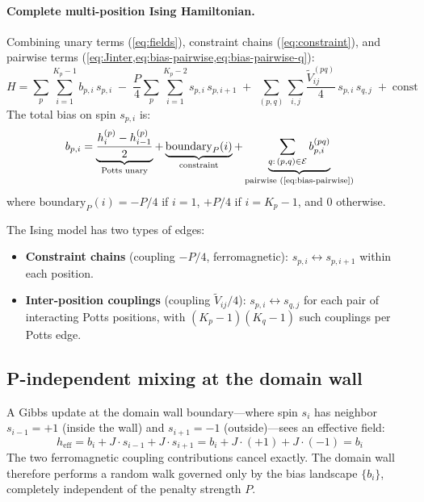 \documentclass[11pt]{article}
\begin{document}
\paragraph{Complete multi-position Ising Hamiltonian.}
Combining unary terms (\cref{eq:fields}), constraint chains (\cref{eq:constraint}), and pairwise terms (\cref{eq:Jinter,eq:bias-pairwise,eq:bias-pairwise-q}):
\begin{equation}\label{eq:full-multi}
\boxed{
  H = \sum_p \sum_{i=1}^{K_p-1} b_{p,i}\, s_{p,i}
    \;-\; \frac{P}{4}\sum_p \sum_{i=1}^{K_p-2} s_{p,i}\, s_{p,i+1}
    \;+\; \sum_{(p,q)} \sum_{i,j} \frac{\widetilde{V}^{(pq)}_{ij}}{4}\, s_{p,i}\, s_{q,j}
    \;+\; \mathrm{const}
}
\end{equation}
The total bias on spin $s_{p,i}$ is:
\begin{equation}\label{eq:total-bias}
  b_{p,i} = \underbrace{\frac{h^{(p)}_i - h^{(p)}_{i-1}}{2}}_{\text{Potts unary}}
  + \underbrace{\text{boundary}_{P}(i)}_{\text{constraint}}
  + \underbrace{\sum_{q:\,(p,q)\in\mathcal{E}} b_{p,i}^{(pq)}}_{\text{pairwise (\cref{eq:bias-pairwise})}}
\end{equation}
where $\text{boundary}_P(i) = -P/4$ if $i=1$, $+P/4$ if $i=K_p{-}1$, and $0$ otherwise.

The Ising model has two types of edges:
\begin{itemize}
  \item \textbf{Constraint chains} (coupling $-P/4$, ferromagnetic): $s_{p,i}\leftrightarrow s_{p,i+1}$ within each position.
  \item \textbf{Inter-position couplings} (coupling $\widetilde{V}_{ij}/4$): $s_{p,i}\leftrightarrow s_{q,j}$ for each pair of interacting Potts positions, with $(K_p{-}1)(K_q{-}1)$ such couplings per Potts edge.
\end{itemize}

\subsection*{P-independent mixing at the domain wall}

A Gibbs update at the domain wall boundary---where spin $s_i$ has neighbor $s_{i-1} = +1$ (inside the wall) and $s_{i+1} = -1$ (outside)---sees an effective field:
\begin{equation}
  h_{\mathrm{eff}} = b_i + J \cdot s_{i-1} + J \cdot s_{i+1} = b_i + J \cdot (+1) + J \cdot (-1) = b_i
\end{equation}
The two ferromagnetic coupling contributions cancel exactly.
The domain wall therefore performs a random walk governed only by the bias landscape $\{b_i\}$, completely independent of the penalty strength $P$.
\end{document}
